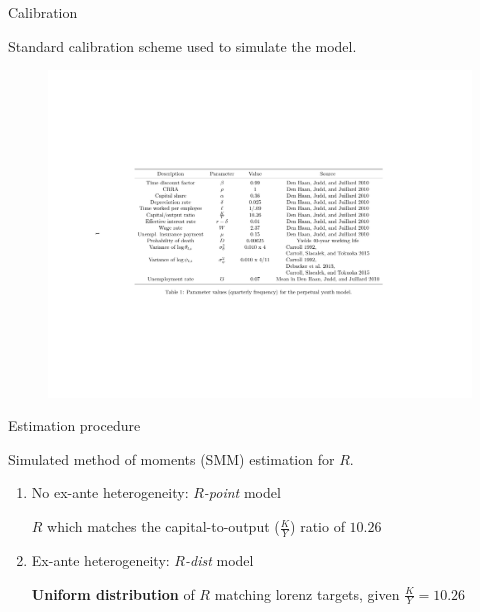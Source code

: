 \documentclass{beamer}
\begin{document}
\begin{frame}{Calibration}

Standard calibration scheme used to simulate the model.

  \vfill
   \begin{figure}
    \centering
    \includegraphics[width=.85\linewidth]{Tables/calibrationPY.pdf}
  \end{figure}
  \vfill

\end{frame}


\begin{frame}{Estimation procedure}


Simulated method of moments (SMM) estimation for $R$.

  \begin{enumerate}
  \item No ex-ante heterogeneity: $R$\textit{-point} model
  \par $R$ which matches the capital-to-output ($\frac{K}{Y}$) ratio of $10.26$
  \vspace{2.5mm}
  
  \item Ex-ante heterogeneity: $R$\textit{-dist} model 
  \par \textbf{Uniform distribution} of $R$ matching lorenz targets, given $\frac{K}{Y} = 10.26$ 
  \end{enumerate}
 
  
\end{frame}
\end{document}
